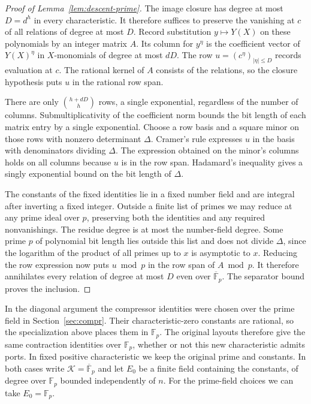 \begin{proof}[Proof of Lemma~\ref{lem:descent-prime}]
The image closure has degree at most $D=d^h$ in every characteristic.
It therefore suffices to preserve the vanishing at $c$ of all relations
of degree at most $D$. Record substitution $y\mapsto Y(X)$ on these
polynomials by an integer matrix $A$. Its column for $y^\eta$ is the
coefficient vector of $Y(X)^\eta$ in $X$-monomials of degree at most
$dD$. The row $u=(c^\eta)_{|\eta|\le D}$ records evaluation at $c$.
The rational kernel of $A$ consists of the relations, so the closure
hypothesis puts $u$ in the rational row span.

There are only $\binom{h+dD}{h}$ rows, a single exponential, regardless
of the number of columns. Submultiplicativity of the coefficient norm
bounds the bit length of each matrix entry by a single exponential.
Choose a row basis and a square minor on those rows with nonzero
determinant $\Delta$. Cramer's rule expresses $u$ in the basis with
denominators dividing $\Delta$. The expression obtained on the minor's
columns holds on all columns because $u$ is in the row span. Hadamard's
inequality gives a singly exponential bound on the bit length of $\Delta$.

The constants of the fixed identities lie in a fixed number field and
are integral after inverting a fixed integer. Outside a finite list of
primes we may reduce at any prime ideal over $p$, preserving both the
identities and any required nonvanishings. The residue degree is at most
the number-field degree. Some prime $p$ of polynomial bit length lies
outside this list and does not divide $\Delta$, since the logarithm of
the product of all primes up to $x$ is asymptotic to $x$. Reducing the row
expression now puts $u\bmod p$ in the row span of $A\bmod p$. It therefore
annihilates every relation of degree at most $D$ even over
$\overline{\mathbb F}_p$. The separator bound proves the inclusion.
\end{proof}

In the diagonal argument the compressor identities were chosen over the
prime field in Section~\ref{sec:compr}. Their characteristic-zero
constants are rational, so the specialization above places them in
$\mathbb F_p$. The original layouts therefore give the same contraction
identities over $\mathbb F_p$, whether or not this new characteristic
admits ports. In fixed positive characteristic we keep the original
prime and constants. In both cases write $\mathcal K=\overline{\mathbb F}_p$
and let $E_0$ be a finite field containing the constants, of degree over
$\mathbb F_p$ bounded independently of $n$. For the prime-field choices
we can take $E_0=\mathbb F_p$.

